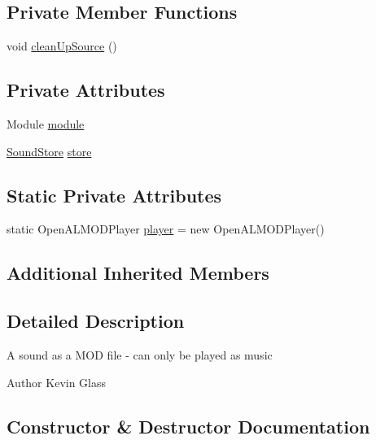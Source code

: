 \subsection*{Private Member Functions}
\begin{DoxyCompactItemize}
\item 
void \mbox{\hyperlink{classorg_1_1newdawn_1_1slick_1_1openal_1_1_m_o_d_sound_a50fa0b6d6dcf64018864606f27718ccd}{clean\+Up\+Source}} ()
\end{DoxyCompactItemize}
\subsection*{Private Attributes}
\begin{DoxyCompactItemize}
\item 
Module \mbox{\hyperlink{classorg_1_1newdawn_1_1slick_1_1openal_1_1_m_o_d_sound_a5ff6f055cad7b57fc73f7a13fe80fee4}{module}}
\item 
\mbox{\hyperlink{classorg_1_1newdawn_1_1slick_1_1openal_1_1_sound_store}{Sound\+Store}} \mbox{\hyperlink{classorg_1_1newdawn_1_1slick_1_1openal_1_1_m_o_d_sound_a36ab5f890c0566a6f9b1797fa91fdc7e}{store}}
\end{DoxyCompactItemize}
\subsection*{Static Private Attributes}
\begin{DoxyCompactItemize}
\item 
static Open\+A\+L\+M\+O\+D\+Player \mbox{\hyperlink{classorg_1_1newdawn_1_1slick_1_1openal_1_1_m_o_d_sound_a84e16ce359baa328eeda4127a337f692}{player}} = new Open\+A\+L\+M\+O\+D\+Player()
\end{DoxyCompactItemize}
\subsection*{Additional Inherited Members}


\subsection{Detailed Description}
A sound as a M\+OD file -\/ can only be played as music

\begin{DoxyAuthor}{Author}
Kevin Glass 
\end{DoxyAuthor}


\subsection{Constructor \& Destructor Documentation}
\mbox{\label{classorg_1_1newdawn_1_1slick_1_1openal_1_1_m_o_d_sound_aa572d7f4bfa20aa03682a937f9d969c1}} 
